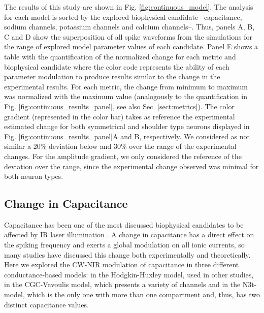 The results of this study are shown in Fig. \ref{fig:continuous_model}. The analysis for each model is sorted by the explored biophysical candidate --capacitance, sodium channels, potassium channels and calcium channels--. Thus, panels A, B, C and D show the superposition of all spike waveforms from the simulations for the range of explored model parameter values of each candidate. Panel E shows a table with the quantification of the normalized change for each metric and biophysical candidate where the color code represents the ability of each parameter modulation to produce results similar to the change in the experimental results. For each metric, the change from minimum to maximum was normalized with the maximum value (analogously to the quantification in Fig. \ref{fig:continuous_results_panel}, see also Sec. \ref{sect:metrics}). The color gradient (represented in the color bar) takes as reference the experimental estimated change for both symmetrical and shoulder type neurons displayed in Fig. \ref{fig:continuous_results_panel}A and B, respectively. We considered as not similar a 20\% deviation below and 30\% over the range of the experimental changes. For the amplitude gradient, we only considered the reference of the deviation over the range, since the experimental change observed was minimal for both neuron types.

\subsection{Change in Capacitance}
Capacitance has been one of the most discussed biophysical candidates to be affected by IR laser illumination \cite{Shapiro2012, shapiro_correction_2017,Cayce2014, Plaksin2018}. A change in capacitance has a direct effect on the spiking frequency and exerts a global modulation on all ionic currents, so many studies have discussed this change both experimentally and theoretically.
Here we explored the CW-NIR modulation of capacitance in three different conductance-based models: in the Hodgkin-Huxley model, used in other studies, in the CGC-Vavoulis model, which presents a variety of channels and in the N3t-model, which is the only one with more than one compartment and, thus, has two distinct capacitance values. 

